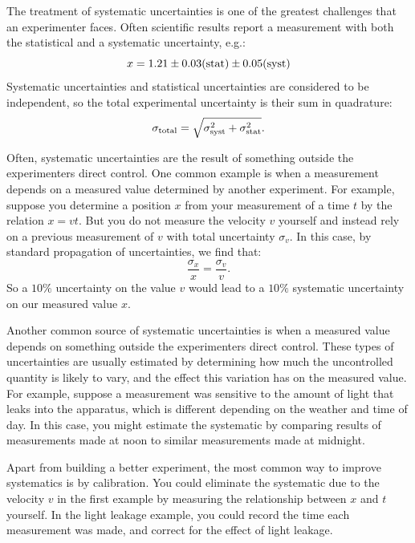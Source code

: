\documentclass[12pt,oneside]{book}
\begin{document}
The treatment of systematic uncertainties is one of the greatest challenges that an experimenter faces.  
Often scientific results report a measurement with both the statistical and a systematic uncertainty, e.g.:
\begin{displaymath}
 x = 1.21 \pm 0.03 ({\rm stat}) \pm 0.05 ({\rm syst})
\end{displaymath}
Systematic uncertainties and statistical uncertainties are considered to be independent, so the total experimental uncertainty is their sum in quadrature:
\begin{displaymath}
\sigma_{\rm total} = \sqrt{\sigma^2_{\rm syst} + \sigma^2_{\rm stat}}.
\end{displaymath}

Often, systematic uncertainties are the result of something outside the experimenters direct control.  One common example is when a measurement depends on a measured value determined by another experiment.  For example, suppose you determine a position $x$ from your measurement of a time $t$ by the relation $x = v t$.  But you do not measure the velocity $v$ yourself and instead rely on a previous measurement of $v$ with total uncertainty $\sigma_v$.  In this case, by standard propagation of uncertainties, we find that:
\begin{displaymath}
\frac{\sigma_x}{x} = \frac{\sigma_v}{v}.
\end{displaymath}
So a $10\%$ uncertainty on the value $v$ would lead to a $10\%$ systematic uncertainty on our measured value $x$.

Another common source of systematic uncertainties is when a measured value depends on something outside the experimenters direct control.   These types of uncertainties are usually estimated by determining how much the uncontrolled quantity is likely to vary, and the effect this variation has on the measured value.  For example, suppose a measurement was sensitive to the amount of light that leaks into the apparatus, which is different depending on the weather and time of day.  In this case, you might estimate the systematic by comparing results of measurements made at noon to similar measurements made at midnight.

Apart from building a better experiment, the most common way to improve systematics is by calibration.  You could eliminate the systematic due to the velocity $v$ in the first example by measuring the relationship between $x$ and $t$ yourself.  In the light leakage example, you could record the time each measurement was made, and correct for the effect of light leakage.  
\end{document}
